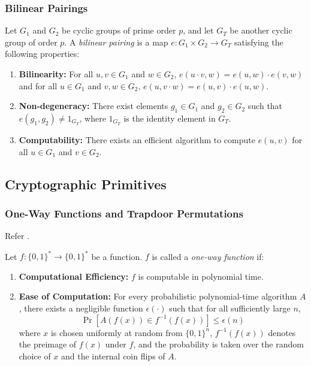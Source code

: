 \documentclass{iacrtrans}
\begin{document}
\subsubsection{Bilinear Pairings}

\begin{definition}
	Let $G_1$ and $G_2$ be cyclic groups of prime order $p$, and let $G_T$ be another cyclic group of order $p$. A \textit{bilinear pairing} is a map $e: G_1 \times G_2 \to G_T$ satisfying the following properties:
	\begin{enumerate}
		\item \textbf{Bilinearity:} For all $u, v \in G_1$ and $w \in G_2$, $e(u \cdot v, w) = e(u, w) \cdot e(v, w)$ and for all $u \in G_1$ and $v, w \in G_2$, $e(u, v \cdot w) = e(u, v) \cdot e(u, w)$.
		\item \textbf{Non-degeneracy:} There exist elements $g_1 \in G_1$ and $g_2 \in G_2$ such that $e(g_1, g_2) \neq 1_{G_T}$, where $1_{G_T}$ is the identity element in $G_T$.
		\item \textbf{Computability:} There exists an efficient algorithm to compute $e(u, v)$ for all $u \in G_1$ and $v \in G_2$.
	\end{enumerate}
			
\end{definition}

\subsection{Cryptographic Primitives}

\subsubsection{One-Way Functions and Trapdoor Permutations}

Refer \cite{Levin2003}.

\begin{definition}
	Let $f: \{0,1\}^* \to \{0,1\}^*$ be a function. $f$ is called a \textit{one-way function} if:
	\begin{enumerate}
		\item \textbf{Computational Efficiency:} $f$ is computable in polynomial time.
		\item \textbf{Ease of Computation:} For every probabilistic polynomial-time algorithm $A$, there exists a negligible function $\epsilon(\cdot)$ such that for all sufficiently large $n$,
		      \[
		      	\Pr[A(f(x)) \in f^{-1}(f(x))] \leq \epsilon(n)
		      \]
		      where $x$ is chosen uniformly at random from $\{0,1\}^n$, $f^{-1}(f(x))$ denotes the preimage of $f(x)$ under $f$, and the probability is taken over the random choice of $x$ and the internal coin flips of $A$.
	\end{enumerate}
\end{definition}
\end{document}
